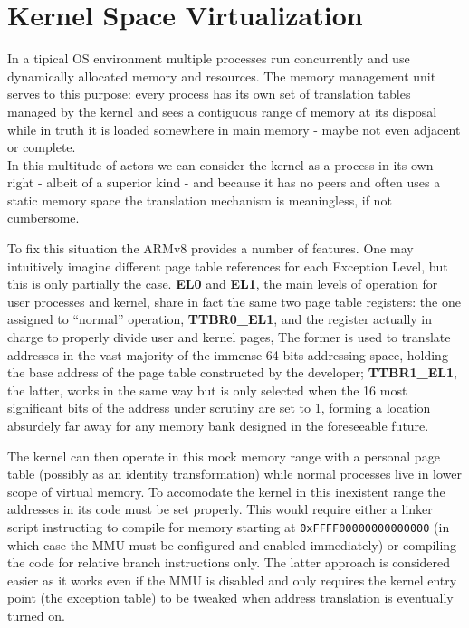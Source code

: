 \documentclass[12pt,a4paper,openright,twoside]{report}
\begin{document}
\section{Kernel Space Virtualization}
\label{kernelvirt}
In a tipical OS environment multiple processes run concurrently and use dynamically
allocated memory and resources. The memory management unit serves to this purpose:
every process has its own set of translation tables managed by the kernel and sees a 
contiguous range of memory at its disposal while in truth it is loaded somewhere
in main memory - maybe not even adjacent or complete.\\
 In this multitude of actors we can
consider the kernel as a process in its own right - albeit of a superior kind -
and because it has no peers and often uses a static memory space the 
translation mechanism is meaningless, if not cumbersome.

To fix this situation the ARMv8 provides a number of features. One may intuitively
imagine different page table references for each Exception Level, but this is 
only partially the case. \textbf{EL0} and \textbf{EL1}, the main levels of operation
for user processes and kernel, share in fact the same two page table registers:
the one assigned to ``normal'' operation, \textbf{TTBR0\_EL1}, and the register
 actually in charge to properly divide user and kernel pages,
 The former is used to translate addresses in the vast majority of the
 immense 64-bits addressing space, holding the base address of the page table
 constructed by the developer; \textbf{TTBR1\_EL1}, the latter, works in the
 same way but is only selected when the 16 most significant bits of the address
 under scrutiny are set to 1, forming a location absurdely far away for any memory 
 bank designed in the foreseeable future.

 The kernel can then operate in this mock memory range with a personal page
 table (possibly as an identity transformation) while normal processes live in 
 lower scope of virtual memory. To accomodate the kernel in this inexistent
 range the addresses in its code must be set properly. This would require either
 a linker script instructing to compile for memory starting at 
 {\tt 0xFFFF00000000000000} (in which case the MMU must be configured and 
 enabled immediately) or compiling the code for relative branch instructions only.
 The latter approach is considered easier as it works even if the MMU is disabled
 and only requires the kernel entry point (the exception table) to be tweaked 
 when address translation is eventually turned on.\\
\end{document}
